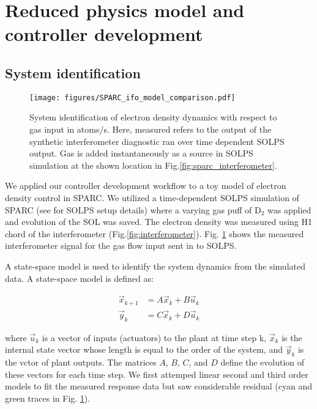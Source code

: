 \section{Reduced physics model and controller development}{\label{sec:model}}

\subsection{System identification}{\label{subssec:sysid}}

\begin{figure}[!h]
 \centering
 \texttt{[image: figures/SPARC\_ifo\_model\_comparison.pdf]}
 \caption{System identification of electron density dynamics with respect to gas 
 input in atoms/s. Here, measured refers to the output of the synthetic interferometer diagnostic ran
 over time dependent SOLPS output\cite{Lore_2023}. Gas is added instantaneously as a source in SOLPS simulation at the shown location in Fig.\ref{fig:sparc_interferometer}.}
 \label{fig:ifo_model_comparison}
\end{figure}

We applied our controller development workflow to a toy model of electron density control in SPARC. We utilized a time-dependent SOLPS simulation of SPARC (see \cite{Lore2024} for SOLPS setup details) where a varying gas puff of $\mathrm{D}_2$ was applied and evolution of the \ac{SOL} was saved. The electron density was measured using H1 chord of the interferometer (Fig.\ref{fig:interferometer}). Fig. \ref{fig:ifo_model_comparison} shows the measured interferometer signal for the gas flow input sent in to SOLPS.

A state-space model is used to identify the system dynamics from the simulated data. A state-space model is defined as:

\begin{equation}
    \begin{split}
        \vec{x}_{k+1} &= A \vec{x}_{k} + B \vec{u}_{k} \\
        \vec{y}_k &= C \vec{x}_k + D \vec{u}_k
    \end{split}
\label{eq:ss}
\end{equation}

where $\vec{u}_{k}$ is a vector of inputs (actuators) to the plant at time step k,  $\vec{x}_{k}$ is the internal state vector whose length is equal to the order of the system, and $\vec{y}_{k}$ is the vctor of plant outputs. The matrices $A$, $B$, $C$, and $D$ define the evolution of these vectors for each time step. We first attemped linear second and third order models to fit the measured response data but saw considerable residual (cyan and green traces in Fig. \ref{fig:ifo_model_comparison}).

